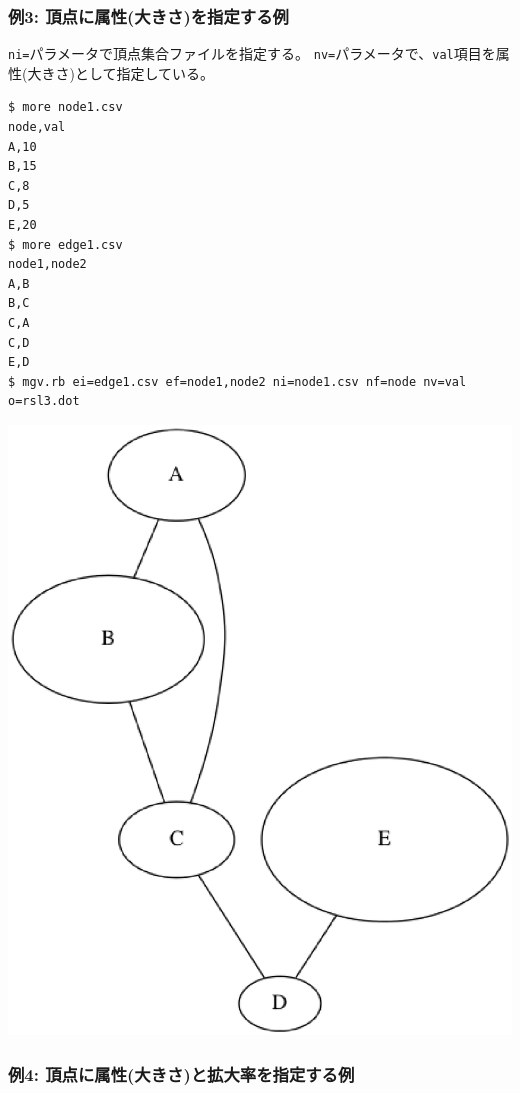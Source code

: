 \subsubsection*{例3: 頂点に属性(大きさ)を指定する例}

\verb|ni=|パラメータで頂点集合ファイルを指定する。
\verb|nv=|パラメータで、\verb|val|項目を属性(大きさ)として指定している。


\begin{Verbatim}[baselinestretch=0.7,frame=single]
$ more node1.csv
node,val
A,10
B,15
C,8
D,5
E,20
$ more edge1.csv
node1,node2
A,B
B,C
C,A
C,D
E,D
$ mgv.rb ei=edge1.csv ef=node1,node2 ni=node1.csv nf=node nv=val o=rsl3.dot
\end{Verbatim}
\begin{minipage}{1.0\hsize}
\begin{center}
\includegraphics[scale=0.3]{figure/mgv3.eps}
\end{center}
\end{minipage}
\subsubsection*{例4: 頂点に属性(大きさ)と拡大率を指定する例}

